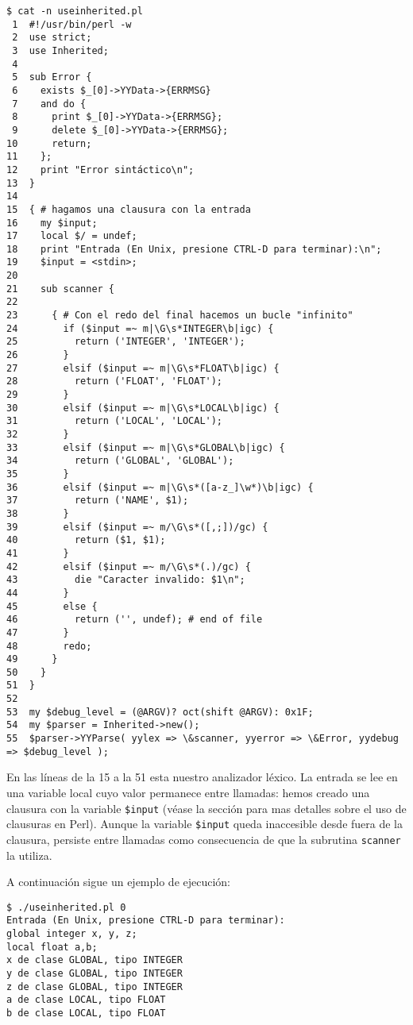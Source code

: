 \begin{verbatim}
$ cat -n useinherited.pl
 1  #!/usr/bin/perl -w
 2  use strict;
 3  use Inherited;
 4
 5  sub Error {
 6    exists $_[0]->YYData->{ERRMSG}
 7    and do {
 8      print $_[0]->YYData->{ERRMSG};
 9      delete $_[0]->YYData->{ERRMSG};
10      return;
11    };
12    print "Error sintáctico\n";
13  }
14
15  { # hagamos una clausura con la entrada
16    my $input;
17    local $/ = undef;
18    print "Entrada (En Unix, presione CTRL-D para terminar):\n";
19    $input = <stdin>;
20
21    sub scanner {
22
23      { # Con el redo del final hacemos un bucle "infinito"
24        if ($input =~ m|\G\s*INTEGER\b|igc) {
25          return ('INTEGER', 'INTEGER');
26        }
27        elsif ($input =~ m|\G\s*FLOAT\b|igc) {
28          return ('FLOAT', 'FLOAT');
29        }
30        elsif ($input =~ m|\G\s*LOCAL\b|igc) {
31          return ('LOCAL', 'LOCAL');
32        }
33        elsif ($input =~ m|\G\s*GLOBAL\b|igc) {
34          return ('GLOBAL', 'GLOBAL');
35        }
36        elsif ($input =~ m|\G\s*([a-z_]\w*)\b|igc) {
37          return ('NAME', $1);
38        }
39        elsif ($input =~ m/\G\s*([,;])/gc) {
40          return ($1, $1);
41        }
42        elsif ($input =~ m/\G\s*(.)/gc) {
43          die "Caracter invalido: $1\n";
44        }
45        else {
46          return ('', undef); # end of file
47        }
48        redo;
49      }
50    }
51  }
52
53  my $debug_level = (@ARGV)? oct(shift @ARGV): 0x1F;
54  my $parser = Inherited->new();
55  $parser->YYParse( yylex => \&scanner, yyerror => \&Error, yydebug => $debug_level );
\end{verbatim}
En las líneas de la 15 a la 51 esta nuestro analizador léxico.
La entrada se lee en una variable local cuyo valor permanece
entre llamadas: hemos creado una clausura con la variable
\verb|$input| (véase la sección  para mas detalles
sobre el uso de clausuras en Perl). Aunque la variable \verb|$input|
queda inaccesible desde fuera de la clausura, persiste entre llamadas
como consecuencia de que la subrutina \verb|scanner| la utiliza.

A continuación sigue un ejemplo de ejecución:

\begin{verbatim}
$ ./useinherited.pl 0
Entrada (En Unix, presione CTRL-D para terminar):
global integer x, y, z;
local float a,b;
x de clase GLOBAL, tipo INTEGER
y de clase GLOBAL, tipo INTEGER
z de clase GLOBAL, tipo INTEGER
a de clase LOCAL, tipo FLOAT
b de clase LOCAL, tipo FLOAT
\end{verbatim}

